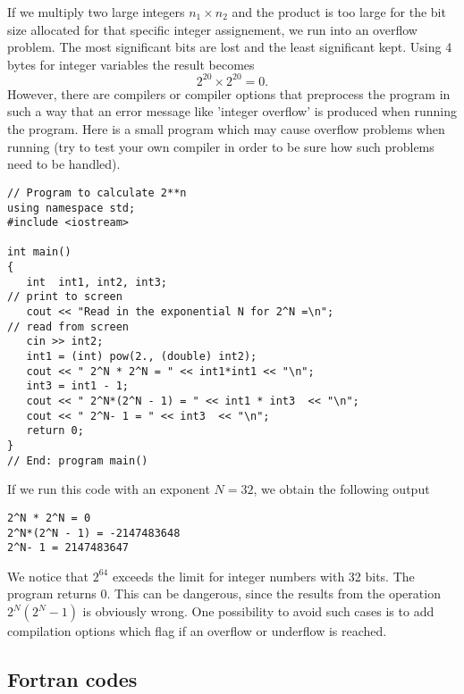 If we multiply two large integers
$n_1\times n_2$ and the product is too large for the bit size allocated
for that specific integer assignement, we run into an overflow problem.
The most significant bits are lost and the least significant
kept. Using 4 bytes for integer variables the result becomes
%
\[
     2^{20} \times 2^{20} =0.
\]
%
However, there are compilers or compiler options that
preprocess the program in such a way that an error message
like 'integer overflow' is produced when running the program.
Here is a small program which may cause overflow problems when
running (try to test your own compiler in order to be sure
how such problems need to be handled).
\begin{lstlisting}[title={\url{http://folk.uio.no/mhjensen/compphys/programs/chapter02/cpp/program3.cpp}}]
// Program to calculate 2**n
using namespace std;
#include <iostream>

int main()
{
   int  int1, int2, int3;
// print to screen
   cout << "Read in the exponential N for 2^N =\n";    
// read from screen
   cin >> int2; 
   int1 = (int) pow(2., (double) int2);
   cout << " 2^N * 2^N = " << int1*int1 << "\n";
   int3 = int1 - 1;
   cout << " 2^N*(2^N - 1) = " << int1 * int3  << "\n";
   cout << " 2^N- 1 = " << int3  << "\n";
   return 0;
} 
// End: program main() 
\end{lstlisting}
If we run this code with an exponent $N=32$, we obtain the following output
\begin{svgraybox}
\begin{verbatim}
2^N * 2^N = 0
2^N*(2^N - 1) = -2147483648
2^N- 1 = 2147483647
\end{verbatim}
\end{svgraybox}
We notice that $2^{64}$ exceeds the limit for integer numbers with 32 bits.  The program returns $0$.
This can be dangerous, since the results from the operation $2^N(2^N-1)$ is obviously wrong.
One possibility to avoid such cases is to add compilation options which flag if an overflow or underflow
is reached.


\subsection{Fortran codes}

